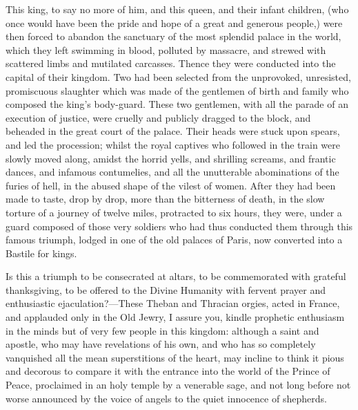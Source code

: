 This king, to say no more of him, and this queen, and their infant children, (who once would have been the pride and hope of a great and generous people,) were then forced to abandon the sanctuary of the most splendid palace in the world, which they left swimming in blood, polluted by massacre, and strewed with scattered limbs and mutilated carcasses. Thence they were conducted into the capital of their kingdom. Two had been selected from the unprovoked, unresisted, promiscuous slaughter which was made of the gentlemen of birth and family who composed the king's body-guard. These two gentlemen, with all the parade of an execution of justice, were cruelly and publicly dragged to the block, and beheaded in the great court of the palace. Their heads were stuck upon spears, and led the procession; whilst the royal captives who followed in the train were slowly moved along, amidst the horrid yells, and shrilling screams, and frantic dances, and infamous contumelies, and all the unutterable abominations of the furies of hell, in the abused shape of the vilest of women. After they had been made to taste, drop by drop, more than the bitterness of death, in the slow torture of a journey of twelve miles, protracted to six hours, they were, under a guard composed of those very soldiers who had thus conducted them through this famous triumph, lodged in one of the old palaces of Paris, now converted into a Bastile for kings.

Is this a triumph to be consecrated at altars, to be commemorated with grateful thanksgiving, to be offered to the Divine Humanity with fervent prayer and enthusiastic ejaculation?—These Theban and Thracian orgies, acted in France, and applauded only in the Old Jewry, I assure you, kindle prophetic enthusiasm in the minds but of very few people in this kingdom: although a saint and apostle, who may have revelations of his own, and who has so completely vanquished all the mean superstitions of the heart, may incline to think it pious and decorous to compare it with the entrance into the world of the Prince of Peace, proclaimed in an holy temple by a venerable sage, and not long before not worse announced by the voice of angels to the quiet innocence of shepherds.


